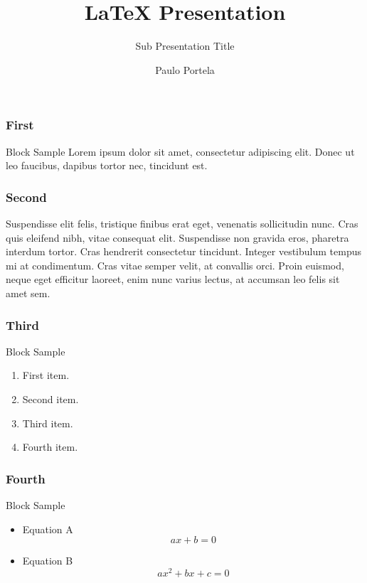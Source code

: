 \documentclass[14pt]{beamer}
\begin{document}
	\author{Paulo Portela}
	\title{LaTeX Presentation}
	\subtitle{Sub Presentation Title}
	\date{}
	\subject{}
	\begin{frame}[plain]
		\maketitle
	\end{frame}
	
	\begin{frame}
		\frametitle{First}
		\begin{block}{Block Sample}
			Lorem ipsum dolor sit amet, consectetur adipiscing elit. \pause %
			Donec ut leo faucibus, dapibus tortor nec, tincidunt est.
		\end{block}
	\end{frame}

	\begin{frame}
		\frametitle{Second}
		Suspendisse elit felis, tristique finibus erat eget, venenatis sollicitudin nunc. Cras quis eleifend nibh, vitae consequat elit. Suspendisse non gravida eros, pharetra interdum tortor. Cras hendrerit consectetur tincidunt. Integer vestibulum tempus mi at condimentum. Cras vitae semper velit, at convallis orci. Proin euismod, neque eget efficitur laoreet, enim nunc varius lectus, at accumsan leo felis sit amet sem.
	\end{frame}

	\begin{frame}
		\frametitle{Third}
		\begin{block}{Block Sample}
			\begin{enumerate}[<+->]  %
				\item First item.
				\item Second item.
				\item Third item.
				\item Fourth item.
			\end{enumerate}
		\end{block}
	\end{frame}

	\begin{frame}
		\frametitle{Fourth}
		\begin{block}{Block Sample}
			\begin{itemize}[<+->]  %
				\item Equation A
					\begin{equation}
						ax + b = 0
					\end{equation}
				\item Equation B
					\begin{equation}
						ax^2 + bx + c = 0
					\end{equation}
			\end{itemize}
		\end{block}
	\end{frame}
\end{document}
